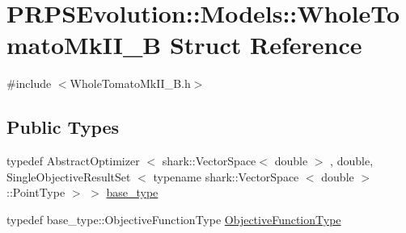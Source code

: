 \hypertarget{struct_p_r_p_s_evolution_1_1_models_1_1_whole_tomato_mk_i_i___b}{\section{\-P\-R\-P\-S\-Evolution\-:\-:\-Models\-:\-:\-Whole\-Tomato\-Mk\-I\-I\-\_\-\-B \-Struct \-Reference}
\label{struct_p_r_p_s_evolution_1_1_models_1_1_whole_tomato_mk_i_i___b}
}


{\ttfamily \#include $<$\-Whole\-Tomato\-Mk\-I\-I\-\_\-\-B.\-h$>$}

\subsection*{\-Public \-Types}
\begin{DoxyCompactItemize}
\item 
typedef \-Abstract\-Optimizer\*
$<$ shark\-::\-Vector\-Space$<$ double $>$\*
, double, \*
\-Single\-Objective\-Result\-Set\*
$<$ typename shark\-::\-Vector\-Space\*
$<$ double $>$\-::\-Point\-Type $>$ $>$ \hyperlink{struct_p_r_p_s_evolution_1_1_models_1_1_whole_tomato_mk_i_i___b_a63167da085f1e1847f1dd13875786010}{base\-\_\-type}
\item 
typedef \*
base\-\_\-type\-::\-Objective\-Function\-Type \hyperlink{struct_p_r_p_s_evolution_1_1_models_1_1_whole_tomato_mk_i_i___b_a48d48c59511c1055a60b819aeaf22c80}{\-Objective\-Function\-Type}
\end{DoxyCompactItemize}
